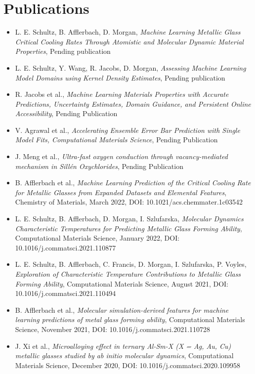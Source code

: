 \section{Publications}

\begin{itemize}
    \item L. E. Schultz, B. Afflerbach,  D. Morgan, \textit{Machine Learning Metallic Glass Critical Cooling Rates Through Atomistic and Molecular Dynamic Material Properties}, Pending publication
    \item L. E. Schultz, Y. Wang, R. Jacobs,  D. Morgan, \textit{Assessing Machine Learning Model Domains using Kernel Density Estimates}, Pending publication
    \item R. Jacobs et al., \textit{Machine Learning Materials Properties with Accurate Predictions, Uncertainty Estimates, Domain Guidance, and Persistent Online Accessibility}, Pending Publication
    \item V. Agrawal et al., \textit{Accelerating Ensemble Error Bar Prediction with Single Model Fits, Computational Materials Science}, Pending Publication
    \item J. Meng et al., \textit{Ultra-fast oxygen conduction through vacancy-mediated mechanism in Sillén Oxychlorides}, Pending Publication
    \item B. Afflerbach et al., \textit{Machine Learning Prediction of the Critical Cooling Rate for Metallic Glasses from Expanded Datasets and Elemental Features}, Chemistry of Materials, March 2022, DOI: 10.1021/acs.chemmater.1c03542
    \item L. E. Schultz, B. Afflerbach, D. Morgan, I. Szlufarska, \textit{Molecular Dynamics Characteristic Temperatures for Predicting Metallic Glass Forming Ability}, Computational Materials Science, January 2022, DOI: 10.1016/j.commatsci.2021.110877
    \item L. E. Schultz, B. Afflerbach, C. Francis, D. Morgan, I. Szlufarska, P. Voyles, \textit{Exploration of Characteristic Temperature Contributions to Metallic Glass Forming Ability}, Computational Materials Science, August 2021, DOI: 10.1016/j.commatsci.2021.110494
   \item B. Afflerbach et al., \textit{Molecular simulation-derived features for machine learning predictions of metal glass forming ability}, Computational Materials Science, November 2021, DOI: 10.1016/j.commatsci.2021.110728
    \item J. Xi et al., \textit{Microalloying effect in ternary Al-Sm-X (X = Ag, Au, Cu) metallic glasses studied by ab initio molecular dynamics}, Computational Materials Science, December 2020, DOI: 10.1016/j.commatsci.2020.109958

\end{itemize}
